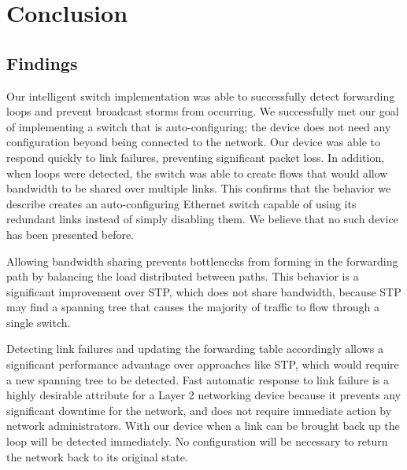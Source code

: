 \section{Conclusion}
  \subsection{Findings}
    Our intelligent switch implementation was able to successfully detect forwarding loops and prevent broadcast storms from occurring.
    We successfully met our goal of implementing a switch that is auto-configuring; the device does not need any configuration beyond being connected to the network.
    Our device was able to respond quickly to link failures, preventing significant packet loss.
    In addition, when loops were detected, the switch was able to create flows that would allow bandwidth to be shared over multiple links.
    This confirms that the behavior we describe creates an auto-configuring Ethernet switch capable of using its redundant links instead of simply disabling them.
    We believe that no such device has been presented before.
    
    Allowing bandwidth sharing prevents bottlenecks from forming in the forwarding path by balancing the load distributed between paths.
    This behavior is a significant improvement over STP, which does not share bandwidth, because STP may find a spanning tree that causes the majority of traffic to flow through a single switch.
    
    Detecting link failures and updating the forwarding table accordingly allows a significant performance advantage over approaches like STP, which would require a new spanning tree to be detected.
    Fast automatic response to link failure is a highly desirable attribute for a Layer 2 networking device because it prevents any significant downtime for the network, and does not require immediate action by network administrators.
    With our device when a link can be brought back up the loop will be detected immediately.
    No configuration will be necessary to return the network back to its original state.
